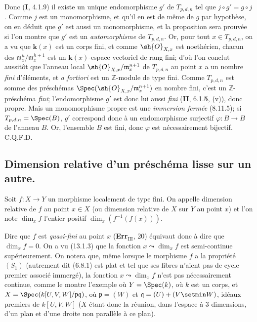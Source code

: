 Donc (\textbf{I}, 4.1.9) il existe un unique endomorphisme $g'$ de $T_{p,d,n}$ tel que $j\circ g'=g\circ j$. Comme $j$ est un monomorphisme, et qu'il en est de même de $g$ par hypothèse, on en déduit que $g'$ est aussi un monomorphisme, et la proposition sera prouvée si l'on montre que $g'$ est un \emph{automorphisme} de $T_{p,d,n}$. Or, pour tout $x\in T_{p,d,n}$, on a vu que $\boldsymbol{k}(x)$ est un corps fini, et comme $\sh{O}_{X,x}$ est noethérien, chacun des $\mathfrak m_x^h/\mathfrak m_x^{h+1}$ est un $\boldsymbol{k}(x)$-espace vectoriel de rang fini; d'où l'on conclut aussitôt que l'anneau local $\sh{O}_{X,x}/\mathfrak m_x^{n+1}$ de $T_{p,d,n}$ au point $x$ a un nombre \emph{fini} d'éléments, et \emph{a fortiori} est un $\mathbb{Z}$-module de type fini. Comme $T_{p,d,n}$ est somme des préschémas $\Spec(\sh{O}_{X,x}/\mathfrak m_x^{n+1})$ en nombre fini, c'est un $\mathbb{Z}$-préschéma \emph{fini}; l'endomorphisme $g'$ est donc lui aussi \emph{fini} (\textbf{II}, 6.1.\textbf{5}, (v)), donc propre. Mais un monomorphisme propre est une \emph{immersion fermée} (8.11.5); si $T_{p,d,n}=\Spec(B)$, $g'$ correspond donc à un endomorphisme surjectif $\varphi:B\to B$ de l'anneau $B$. Or, l'ensemble $B$ est fini, donc $\varphi$ est nécessairement bijectif. C.Q.F.D.

\subsection{Dimension relative d'un préschéma lisse sur un autre.}

\begin{definition}[17.10.1]
Soit $f:X\to Y$ un morphisme localement de type fini. On appelle dimension relative de $f$ au point $x\in X$ (ou dimension relative de $X$ sur $Y$ au point $x$) et l'on note $\dim_x f$ l'entier positif $\dim_x(f^{-1}(f(x)))$.
\end{definition}

Dire que $f$ est \emph{quasi-fini} au point $x$ (\textbf{Err}$_{\mathrm{III}}$, 20) équivaut donc à dire que $\dim_x f=0$. On a vu (13.1.3) que la fonction $x\leadsto\dim_x f$ est semi-continue supérieurement. On notera que, même lorsque le morphisme $f$ a la propriété $(S_1)$ (autrement dit (6.8.1) est plat et tel que ses fibres n'aient pas de cycle premier associé immergé), la fonction $x\leadsto\dim_x f$ n'est pas nécessairement continue, comme le montre l'exemple où $Y=\Spec(k)$, où $k$ est un corps, et $X=\Spec(k[U,V,W]/\mathfrak p\mathfrak q)$, où $\mathfrak p=(W)$ et $\mathfrak q=(U)+(V\setmin W)$, idéaux premiers de $k[U,V,W]$ ($X$ étant donc la réunion, dans l'espace à 3 dimensions, d'un plan et d'une droite non parallèle à ce plan).


